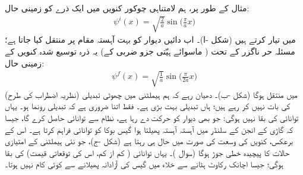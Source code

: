  مثال کے طور پر، ہم لامتناہی چوکور کنویں میں ایک ذرے کو زمینی حال:
\begin{align}
\psi^i (x) = \sqrt{\frac{2}{a}} \sin \big ( \frac{\pi}{a} x \big )
\end{align}
 میں تیار کرتے ہیں (شکل -ا)۔ اب دائیں دیوار کو بہت آہستہ مقام  پر منتقل کیا جاتا ہے؛ مسئلہ حر ناگزر کے تحت ( ماسوائے ہیّتی جزو ضربی کے) یہ ذرہ توسیع شدہ کنویں کے زمینی حال:
\begin{align}
\psi^f (x) = \sqrt{\frac{1}{a}} \sin \big ( \frac{\pi}{2a} x \big )
\end{align}
 میں منتقل ہوگا (شکل -ب)۔ دھیان رہے کہ ہم ہیملٹنی میں چھوٹی تبدیلی (نظریہ اضطراب کی طرح) کی بات نہیں کر رہے ہیں؛ ہاں تبدیلی بہت بڑی ہے۔ فقط اتنا ضروری ہے کہ تبدیلی  رونما ہو۔ یہاں توانائی کی بقا نہیں ہوگی: جو بھی دیوار کو حرکت دے رہا ہے، نظام سے توانائی حاصل کرے گا، جیسا کہ گاڑی کے انجن کے سلنڈر میں آہستہ آہستہ پھیلتا ہوا گیس بوکا کو توانائی فراہم کرتا ہے۔ اس کے برعکس، کنویں کی  وسعت کی صورت میں حال  ہی رہتا ہے (شکل -ج)، جو نئی ہیملٹنی کے امتیازی حالات کا پیچیدہ خطی جوڑ ہوگا (سوال )۔ یہاں توانائی ( کم از کم، اس کی توقعاتی قیمت) کی بقا ہوگی؛ جیسا اچانک رکاوٹ ہٹانے سے خلاء میں گیس کی آزادانہ پھیلانے سے کوئی کام نہیں ہوتا۔


